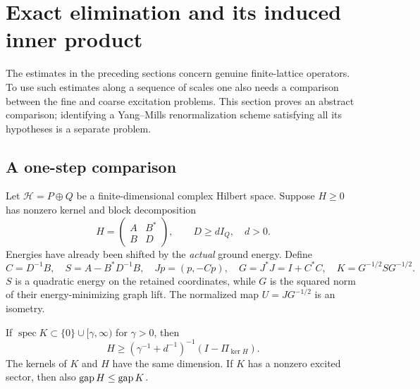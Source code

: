 \section{Exact elimination and its induced inner product}\label{sec:schur}

The estimates in the preceding sections concern genuine finite-lattice
operators. To use such estimates along a sequence of scales one also needs
a comparison between the fine and coarse excitation problems. This section
proves an abstract comparison; identifying a Yang--Mills renormalization
scheme satisfying all its hypotheses is a separate problem.

\subsection{A one-step comparison}

Let $\mathcal H=P\oplus Q$ be a finite-dimensional complex Hilbert space.
Suppose $H\ge0$ has nonzero kernel and block decomposition
\begin{equation}
 H=\begin{pmatrix}A&B^*\\B&D\end{pmatrix},
 \qquad D\ge dI_Q,\quad d>0 .
\end{equation}
Energies have already been shifted by the \emph{actual} ground energy.
Define
\begin{equation}\label{eq:schur-def}
 C=D^{-1}B,\quad S=A-B^*D^{-1}B,\quad
 Jp=(p,-Cp),\quad G=J^*J=I+C^*C,\quad
 K=G^{-1/2}SG^{-1/2}.
\end{equation}
$S$ is a quadratic energy on the retained coordinates, while $G$ is the
squared norm of their energy-minimizing graph lift. The normalized map
$U=JG^{-1/2}$ is an isometry.

\begin{proposition}\label{prop:schur}
If $\operatorname{spec}K\subset\{0\}\cup[\gamma,\infty)$ for $\gamma>0$,
then
\begin{equation}\label{eq:schur-gap}
 H\ge\left(\gamma^{-1}+d^{-1}\right)^{-1}
                (I-\Pi_{\ker H}).
\end{equation}
The kernels of $K$ and $H$ have the same dimension. If $K$ has a nonzero
excited sector, then also $\operatorname{gap} H\le\operatorname{gap} K$.
\end{proposition}

